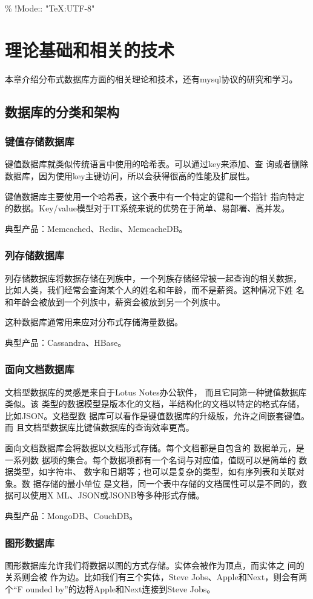 \% !Mode:: "TeX:UTF-8"

\chapter{理论基础和相关的技术}
本章介绍分布式数据库方面的相关理论和技术，还有mysql协议的研究和学习。
\section{数据库的分类和架构}
\subsection{键值存储数据库}
键值数据库就类似传统语言中使用的哈希表。可以通过key来添加、查
询或者删除数据库，因为使用key主键访问，所以会获得很高的性能及扩展性。

键值数据库主要使用一个哈希表，这个表中有一个特定的键和一个指针
指向特定的数据。Key/value模型对于IT系统来说的优势在于简单、易部署、高并发。

典型产品：Memcached、Redis、MemcacheDB。
\subsection{列存储数据库}
列存储数据库将数据存储在列族中，一个列族存储经常被一起查询的相关数据，
比如人类，我们经常会查询某个人的姓名和年龄，而不是薪资。这种情况下姓
名和年龄会被放到一个列族中，薪资会被放到另一个列族中。

这种数据库通常用来应对分布式存储海量数据。

典型产品：Cassandra、HBase。
\subsection{面向文档数据库}
文档型数据库的灵感是来自于Lotus Notes办公软件，
而且它同第一种键值数据库类似。该
类型的数据模型是版本化的文档，半结构化的文档以特定的格式存储，比如JSON。文档型数
据库可以看作是键值数据库的升级版，允许之间嵌套键值。而
且文档型数据库比键值数据库的查询效率更高。

面向文档数据库会将数据以文档形式存储。每个文档都是自包含的
数据单元，是一系列数
据项的集合。每个数据项都有一个名词与对应值，值既可以是简单的
数据类型，如字符串、
数字和日期等；也可以是复杂的类型，如有序列表和关联对象。数
据存储的最小单位
是文档，同一个表中存储的文档属性可以是不同的，数据可以使用X
ML、JSON或JSONB等多种形式存储。

典型产品：MongoDB、CouchDB。
\subsection{图形数据库}
图形数据库允许我们将数据以图的方式存储。实体会被作为顶点，而实体之
间的关系则会被
作为边。比如我们有三个实体，Steve Jobs、Apple和Next，则会有两个“F
ounded by”的边将Apple和Next连接到Steve Jobs。


